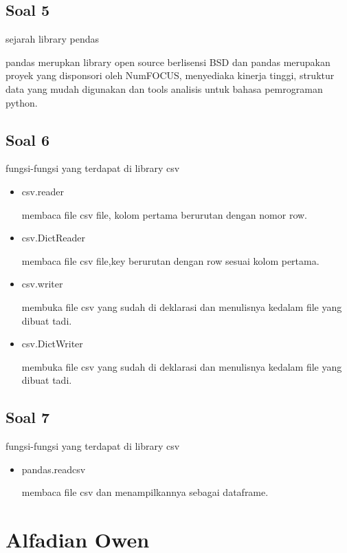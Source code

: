 \subsection{Soal 5}
sejarah library pendas

pandas merupkan library open source berlisensi BSD dan pandas merupakan proyek yang disponsori oleh NumFOCUS, menyediaka kinerja tinggi, struktur data yang mudah digunakan dan tools analisis untuk bahasa pemrograman python.  

\subsection{Soal 6}
fungsi-fungsi yang terdapat di library csv
\begin{itemize}
	\item csv.reader
	
	membaca file csv file, kolom pertama berurutan dengan nomor row. 
	
	\item csv.DictReader
	
	
	membaca file csv file,key berurutan dengan row sesuai kolom pertama.
		
	\item csv.writer
	
	membuka file csv yang sudah di deklarasi dan menulisnya kedalam file yang dibuat tadi.
		
	\item csv.DictWriter
	
	membuka file csv yang sudah di deklarasi dan menulisnya kedalam file yang dibuat tadi.	
	
\end{itemize}

\subsection{Soal 7}
fungsi-fungsi yang terdapat di library csv
\begin{itemize}

	\item pandas.read\textunderscore csv

	membaca file csv dan menampilkannya sebagai dataframe.
	
\end{itemize}


\section{Alfadian Owen}
